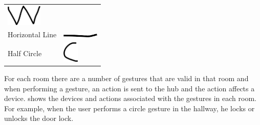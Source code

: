 \begin{table}[h!]
\begin{tabular}{ll}
\begin{minipage}{.3\textwidth}
  \includegraphics[height=1cm]{images/gesture-w}
\end{minipage}
\\[0.5cm]
Horizontal Line       &
\begin{minipage}{.3\textwidth}
  \includegraphics[width=1.75cm]{images/gesture-horizontal-line}
\end{minipage}
\\[0.5cm]
Half Circle           &                      
\begin{minipage}{.3\textwidth}
  \includegraphics[height=1cm]{images/gesture-half-circle}
\end{minipage}
\end{tabular}
\end{table}

For each room there are a number of gestures that are valid in that room and when performing a gesture, an action is sent to the hub and the action affects a device.  shows the devices and actions associated with the gestures in each room. For example, when the user performs a circle gesture in the hallway, he locks or unlocks the door lock.

